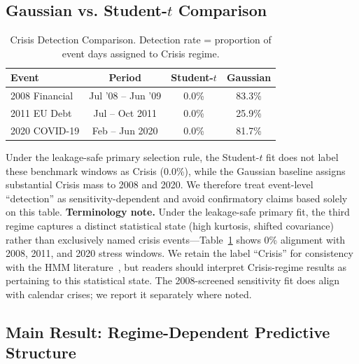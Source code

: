 \documentclass{uai2026}
\begin{document}
\subsection{Gaussian vs. Student-\texorpdfstring{$t$}{t} Comparison}
\label{sec:gaussian_comparison}

\begin{table}[t]
\centering
\caption{Crisis Detection Comparison. Detection rate = proportion of event days
assigned to Crisis regime.}
\label{tab:detection}
\small
\begin{tabular}{lccc}
\toprule
Event & Period & Student-$t$ & Gaussian \\
\midrule
2008 Financial & Jul '08 -- Jun '09 & 0.0\% & 83.3\% \\
2011 EU Debt & Jul -- Oct 2011 & 0.0\% & 25.9\% \\
2020 COVID-19 & Feb -- Jun 2020 & 0.0\% & 81.7\% \\
\bottomrule
\end{tabular}
\end{table}

Under the leakage-safe primary selection rule, the Student-$t$ fit does not
label these benchmark windows as Crisis (0.0\%), while the Gaussian baseline
assigns substantial Crisis mass to 2008 and 2020. We therefore treat event-level
``detection'' as sensitivity-dependent and avoid confirmatory claims based solely
on this table.
\textbf{Terminology note.} Under the leakage-safe primary fit, the third regime
captures a distinct statistical state (high kurtosis, shifted covariance) rather
than exclusively named crisis events---Table~\ref{tab:detection} shows 0\% alignment
with 2008, 2011, and 2020 stress windows. We retain the label ``Crisis'' for
consistency with the HMM literature~\cite{bulla2011hidden}, but readers should
interpret Crisis-regime results as pertaining to this statistical state. The 2008-screened
sensitivity fit does align with calendar crises; we report it separately where noted.

\subsection{Main Result: Regime-Dependent Predictive Structure}
\label{sec:main_result}
\end{document}
